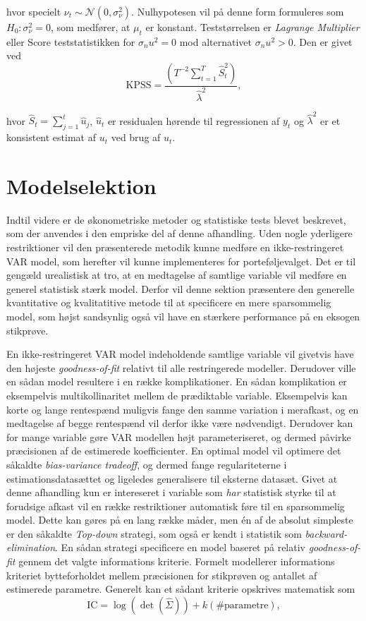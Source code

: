 \documentclass[
  a4paper,
  oneside]{memoir}
\begin{document}
hvor specielt \(\nu_t\sim\mathcal{N}(0,\sigma_\nu ^2)\). Nulhypotesen vil på denne form formuleres som \(H_0:\sigma_\nu^2=0\), som medfører, at \(\mu_t\) er konstant. Teststørrelsen er \emph{Lagrange Multiplier} eller Score teststatistikken for \(\sigma_nu ^2=0\) mod alternativet \(\sigma_nu ^2>0\). Den er givet ved
\[\text{KPSS}=\frac{(T^{-2} \sum_{t=1}^T \hat{S}_t^2)}{\hat{\lambda}^2},\]

hvor \(\hat{S}_t=\sum_{j=1}^t \hat{u}_j\), \(\hat{u}_t\) er residualen hørende til regressionen af \(y_t\) og \(\hat{\lambda}^2\) er et konsistent estimat af \(u_t\) ved brug af \(\hat{u}_t\).

\hypertarget{sekmodelselek}{%
\section{Modelselektion}\label{sekmodelselek}}

Indtil videre er de økonometriske metoder og statistiske tests blevet beskrevet, som der anvendes i den empriske del af denne afhandling. Uden nogle yderligere restriktioner vil den præsenterede metodik kunne medføre en ikke-restringeret VAR model, som herefter vil kunne implementeres for porteføljevalget. Det er til gengæld urealistisk at tro, at en medtagelse af samtlige variable vil medføre en generel statistisk stærk model. Derfor vil denne sektion præsentere den generelle kvantitative og kvalitatitive metode til at specificere en mere sparsommelig model, som højst sandsynlig også vil have en stærkere performance på en eksogen stikprøve.

En ikke-restringeret VAR model indeholdende samtlige variable vil givetvis have den højeste \emph{goodness-of-fit} relativt til alle restringerede modeller. Derudover ville en sådan model resultere i en række komplikationer. En sådan komplikation er eksempelvis multikollinaritet mellem de prædiktable variable. Eksempelvis kan korte og lange rentespænd muligvis fange den samme variation i merafkast, og en medtagelse af begge rentespænd vil derfor ikke være nødvendigt. Derudover kan for mange variable gøre VAR modellen højt parameteriseret, og dermed påvirke præcisionen af de estimerede koefficienter. En optimal model vil optimere det såkaldte \emph{bias-variance tradeoff}, og dermed fange regulariteterne i estimationsdatasættet og ligeledes generalisere til eksterne datasæt. Givet at denne afhandling kun er intereseret i variable som \emph{har} statistisk styrke til at forudsige afkast vil en række restriktioner automatisk føre til en sparsommelig model. Dette kan gøres på en lang række måder, men én af de absolut simpleste er den såkaldte \emph{Top-down} strategi, som også er kendt i statistik som \emph{backward-elimination}. En sådan strategi specificere en model baseret på relativ \emph{goodness-of-fit} gennem det valgte informations kriterie. Formelt modellerer informations kriteriet bytteforholdet mellem præcisionen for stikprøven og antallet af estimerede parametre. Generelt kan et sådant kriterie opskrives matematisk som
\[\text{IC}=\log(\det(\hat{\Sigma}))+k(\#\text{parametre}),\]
\end{document}
